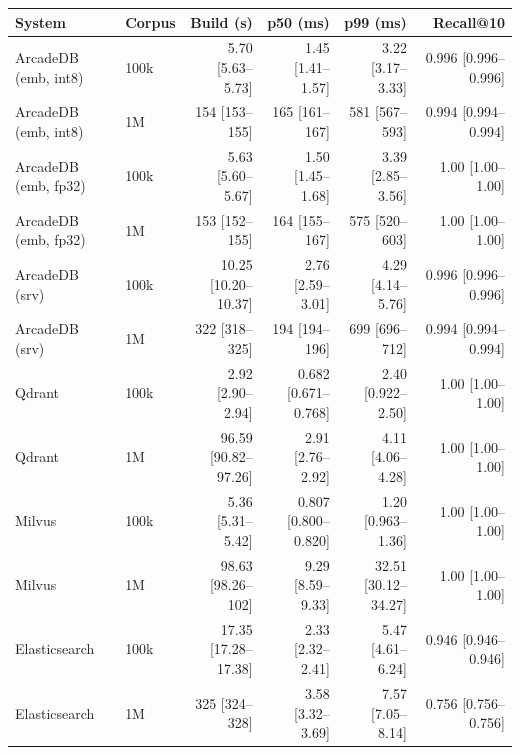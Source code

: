 \begin{tabular}{llrrrr}
\toprule
System & Corpus & Build (s) & p50 (ms) & p99 (ms) & Recall@10 \\
\midrule
ArcadeDB (emb, int8) & 100k & 5.70 [5.63--5.73] & 1.45 [1.41--1.57] & 3.22 [3.17--3.33] & 0.996 [0.996--0.996] \\
ArcadeDB (emb, int8) & 1M & 154 [153--155] & 165 [161--167] & 581 [567--593] & 0.994 [0.994--0.994] \\
ArcadeDB (emb, fp32) & 100k & 5.63 [5.60--5.67] & 1.50 [1.45--1.68] & 3.39 [2.85--3.56] & 1.00 [1.00--1.00] \\
ArcadeDB (emb, fp32) & 1M & 153 [152--155] & 164 [155--167] & 575 [520--603] & 1.00 [1.00--1.00] \\
ArcadeDB (srv) & 100k & 10.25 [10.20--10.37] & 2.76 [2.59--3.01] & 4.29 [4.14--5.76] & 0.996 [0.996--0.996] \\
ArcadeDB (srv) & 1M & 322 [318--325] & 194 [194--196] & 699 [696--712] & 0.994 [0.994--0.994] \\
Qdrant & 100k & 2.92 [2.90--2.94] & 0.682 [0.671--0.768] & 2.40 [0.922--2.50] & 1.00 [1.00--1.00] \\
Qdrant & 1M & 96.59 [90.82--97.26] & 2.91 [2.76--2.92] & 4.11 [4.06--4.28] & 1.00 [1.00--1.00] \\
Milvus & 100k & 5.36 [5.31--5.42] & 0.807 [0.800--0.820] & 1.20 [0.963--1.36] & 1.00 [1.00--1.00] \\
Milvus & 1M & 98.63 [98.26--102] & 9.29 [8.59--9.33] & 32.51 [30.12--34.27] & 1.00 [1.00--1.00] \\
Elasticsearch & 100k & 17.35 [17.28--17.38] & 2.33 [2.32--2.41] & 5.47 [4.61--6.24] & 0.946 [0.946--0.946] \\
Elasticsearch & 1M & 325 [324--328] & 3.58 [3.32--3.69] & 7.57 [7.05--8.14] & 0.756 [0.756--0.756] \\
\bottomrule
\end{tabular}
